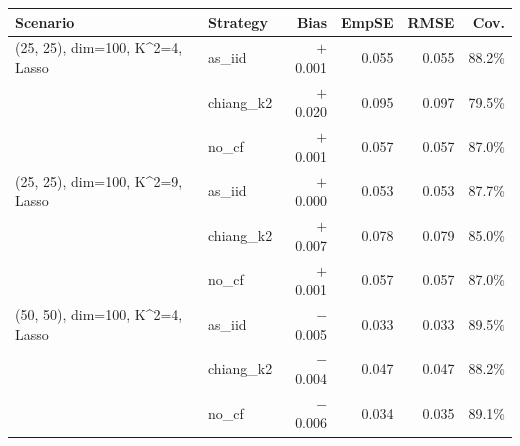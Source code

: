 \begin{tabular}{llrrrr}
\toprule
\textbf{Scenario} & \textbf{Strategy} & \textbf{Bias} & \textbf{EmpSE} & \textbf{RMSE} & \textbf{Cov.} \\
\midrule
  (25, 25),  dim=100,  K^2=4,  Lasso & as\_iid & $+$0.001 & 0.055 & 0.055 & 88.2\% \\
   & chiang\_k2 & $+$0.020 & 0.095 & 0.097 & 79.5\% \\
   & no\_cf & $+$0.001 & 0.057 & 0.057 & 87.0\% \\
\midrule
  (25, 25),  dim=100,  K^2=9,  Lasso & as\_iid & $+$0.000 & 0.053 & 0.053 & 87.7\% \\
   & chiang\_k2 & $+$0.007 & 0.078 & 0.079 & 85.0\% \\
   & no\_cf & $+$0.001 & 0.057 & 0.057 & 87.0\% \\
\midrule
  (50, 50),  dim=100,  K^2=4,  Lasso & as\_iid & $-$0.005 & 0.033 & 0.033 & 89.5\% \\
   & chiang\_k2 & $-$0.004 & 0.047 & 0.047 & 88.2\% \\
   & no\_cf & $-$0.006 & 0.034 & 0.035 & 89.1\% \\
\bottomrule
\end{tabular}